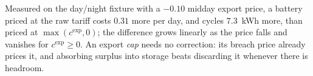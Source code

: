 \documentclass[11pt,a4paper]{article}
\newcommand{\cexp}{c^{\mathrm{exp}}}
\begin{document}
\smallskip\noindent
Measured on the day/night fixture with a $-0.10$ midday export price, a battery
priced at the raw tariff costs $0.31$ more per day, and cycles $7.3$~kWh more,
than priced at $\max(\cexp, 0)$; the difference grows linearly as the price falls
and vanishes for $\cexp \ge 0$. An export \emph{cap} needs no correction: its
breach price already prices it, and absorbing surplus into storage beats
discarding it whenever there is headroom.
\end{document}
